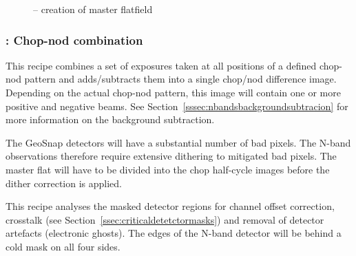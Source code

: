 \begin{figure}[hb]
  \centering
    \def \globalscale {0.700000}
    \fontsize{10}{12}\selectfont
    
  \caption[Recipe: ]{ --
    creation of  master flatfield}
  \label{fig:metis_n_img_flat}
\end{figure}

\subsubsection{:  Chop-nod combination}
\label{img_n_chopnod}
\label{rec:img_n_chopnod}
\label{rec:metis_n_img_chopnod}
\label{sssec:img_n_chopnod}

This recipe combines a set of exposures taken at all positions of a
defined chop-nod pattern and adds/subtracts them into a single
chop/nod difference image. Depending on the actual chop-nod pattern,
this image will contain one or more positive and negative beams.
See Section~\ref{sssec:nbandsbackgroundsubtracion} for more information
on the background subtraction.

The GeoSnap detectors will have a substantial number of bad pixels.
The N-band observations therefore require extensive dithering to mitigated bad pixels.
The master flat will have to be divided into the chop half-cycle images before the dither correction is applied.

This recipe analyses the masked detector regions for channel offset correction, crosstalk (see Section~\ref{ssec:criticaldetetctormasks}) and removal of detector artefacts (electronic ghosts).
The edges of the N-band detector will be behind a cold mask on all four sides.


